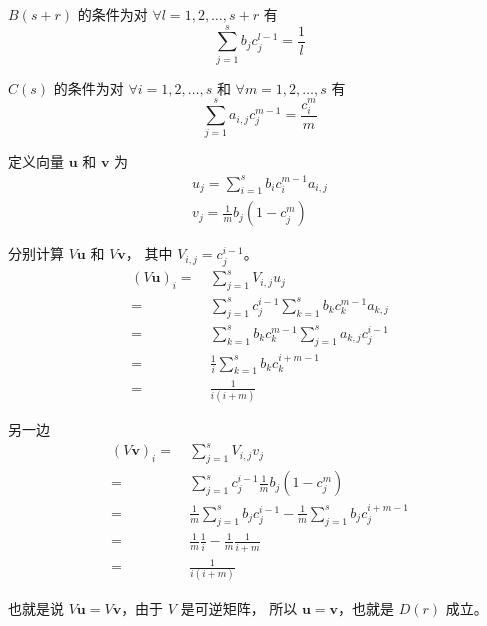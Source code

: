 \documentclass[a4paper]{article}
\begin{document}
\par $B(s+r)$ 的条件为对 $\forall l = 1,2,\ldots,s+r$ 有 
\begin{equation}
    \sum_{j=1}^{s} b_j c_j^{l-1} = \frac{1}{l}
\end{equation}
\par $C(s)$ 的条件为对 $\forall i = 1,2,\ldots,s$ 和 $\forall m = 1,2,\ldots,s$ 有
\begin{equation}
    \sum_{j=1}^{s} a_{i,j} c_j^{m-1} = \frac{c_i^m}{m}
\end{equation}
\par 定义向量 $\mathbf{u}$ 和 $\mathbf{v}$ 为
\begin{gather}
    u_j = \sum_{i=1}^{s} b_ic_i^{m-1}a_{i,j}\\
    v_j = \frac{1}{m}b_j(1 - c_j^m)
\end{gather}
\par 分别计算 $V\mathbf{u}$ 和 $V\mathbf{v}$，
其中 $V_{i,j} = c_j^{i-1}$。
\begin{equation}
    \begin{aligned}
        \left(V\mathbf{u}\right)_i
        =&\ \sum_{j=1}^{s} V_{i,j} u_j\\
        =&\ \sum_{j=1}^{s} c_j^{i-1} \sum_{k=1}^{s} b_k c_k^{m-1} a_{k,j}\\
        =&\ \sum_{k=1}^{s} b_k c_k^{m-1} \sum_{j=1}^{s} a_{k,j} c_j^{i-1}\\
        =&\ \frac{1}{i}\sum_{k=1}^{s} b_k c_k^{i+m-1}\\
        =&\ \frac{1}{i(i+m)}
    \end{aligned}
\end{equation}
\par 另一边
\begin{equation}
    \begin{aligned}
        \left(V\mathbf{v}\right)_i
        =&\ \sum_{j=1}^{s} V_{i,j} v_j\\
        =&\ \sum_{j=1}^{s} c_j^{i-1} \frac{1}{m} b_j (1 - c_j^m)\\
        =&\ \frac{1}{m}\sum_{j=1}^{s} b_j c_j^{i-1} - \frac{1}{m}\sum_{j=1}^{s} b_j c_j^{i+m-1}\\
        =&\ \frac{1}{m}\frac{1}{i}-\frac{1}{m}\frac{1}{i+m}\\
        =&\ \frac{1}{i(i+m)}
    \end{aligned}
\end{equation}
\par 也就是说 $V\mathbf{u} = V\mathbf{v}$，由于 $V$ 是可逆矩阵，
所以 $\mathbf{u} = \mathbf{v}$，也就是 $D(r)$ 成立。
\end{document}
